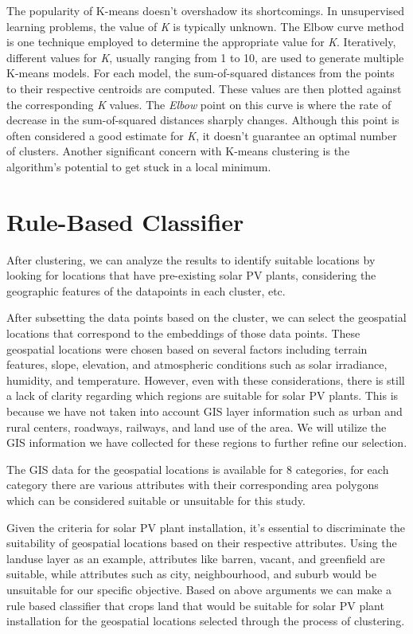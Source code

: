 \documentclass[a4paper,12pt]{Classes/RoboticsLaTeX}
\begin{document}
	 The popularity of K-means doesn't overshadow its shortcomings. In unsupervised learning problems, the value of \textit{K} 
	 is typically unknown. The Elbow curve method is one technique employed to determine the appropriate value for \textit{K}. 
	 Iteratively, different values for \textit{K}, usually ranging from 1 to 10, are used to generate multiple K-means models. 
	 For each model, the sum-of-squared distances from the points to their respective centroids are computed. These values are 
	 then plotted against the corresponding \textit{K} values. The \textit{Elbow} point on this curve is where the rate of decrease 
	 in the sum-of-squared distances sharply changes. Although this point is often considered a good estimate for \textit{K}, it doesn't 
	 guarantee an optimal number of clusters. Another significant concern with K-means clustering is the algorithm's potential to get stuck in a local minimum.


	\section{Rule-Based Classifier}

	After clustering, we can analyze the results to identify suitable locations by looking for locations that have pre-existing solar PV plants, considering the 
	geographic features of the datapoints in each cluster, etc. 

	After subsetting the data points based on the cluster, we can select the geospatial locations that correspond to the embeddings of those data points. These 
	geospatial locations were chosen based on several factors including terrain features, slope, elevation, and atmospheric conditions such as solar irradiance, 
	humidity, and temperature. However, even with these considerations, there is still a lack of clarity regarding which regions are suitable for solar PV plants. 
	This is because we have not taken into account \ac{GIS} layer information such as urban and rural centers, roadways, railways, and land use of the area. We will utilize 
	the \ac{GIS} information we have collected for these regions to further refine our selection.

	The \ac{GIS} data for the geospatial locations is available for 8 categories, for each category there are various
	attributes with their corresponding area polygons which can be considered suitable or unsuitable for this study.

	Given the criteria for solar PV plant installation, it's essential to discriminate the suitability of geospatial locations based on their respective attributes. 
	Using the landuse layer as an example, attributes like barren, vacant, and greenfield are suitable, while attributes such as city, neighbourhood, and suburb would 
	be unsuitable for our specific objective. Based on above arguments we can make a rule based classifier that crops land that would be suitable for solar PV plant installation 
	for the geospatial locations selected through the process of clustering. 
\end{document}
